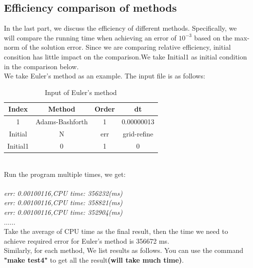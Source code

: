\documentclass[a4paper,twocolumn]{article}
\theoremstyle{definition}
\begin{document}
\subsection{Efficiency comparison of methods}
In the last part, we discuss the efficiency of different methods. Specifically, we will compare the running time when achieving an error of $10^{-3}$ based on the max-norm of the solution error. Since we are comparing relative efficiency, initial consition has little impact on the comparison.We take Initial1 as initial condition in the comparison below.\\
We take Euler's method as an example. The input file is as follows:
\begin{table}[!htp]
	\centering
	\begin{tabular}{|c|c|c|c|}
		\hline	
		Index & Method & Order & dt \\
		\hline		
		1 & Adams-Bashforth & 1 & 0.00000013   \\	
		\hline \hline
		Initial & N & err & grid-refine \\
		\hline
		Initial1 & 0 & 1 & 0 \\
		\hline
	\end{tabular}
	\caption{Input of Euler's method }
	\label{tab:4}
\end{table}\\
Run the program multiple times, we get:\\\\
\emph{err: 0.00100116,CPU time: 356232(ms)}\\
\emph{err: 0.00100116,CPU time: 358821(ms)}\\
\emph{err: 0.00100116,CPU time: 352904(ms)}\\
\emph{$\dots\dots$ }\\
\noindent Take the average of CPU time as the final result, then the time we need to achieve required error for Euler's method is 356672 ms.\\
Similarly, for each method, We list results as follows. You can use the command \textbf{"make test4"} to get all the result\textbf{(will take much time)}. 
\newpage
\onecolumn
\end{document}

